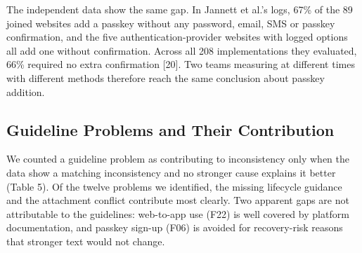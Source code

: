 \documentclass[letterpaper,twocolumn,10pt]{article}
\begin{document}
The independent data show the same gap. In Jannett et al.'s logs, 67\% of the 89 joined websites add a passkey without any password, email, SMS or passkey confirmation, and the five authentication-provider websites with logged options all add one without confirmation. Across all 208 implementations they evaluated, 66\% required no extra confirmation {[}20{]}. Two teams measuring at different times with different methods therefore reach the same conclusion about passkey addition.

\subsection{Guideline Problems and Their Contribution}

We counted a guideline problem as contributing to inconsistency only when the data show a matching inconsistency and no stronger cause explains it better (Table 5). Of the twelve problems we identified, the missing lifecycle guidance and the attachment conflict contribute most clearly. Two apparent gaps are not attributable to the guidelines: web-to-app use (F22) is well covered by platform documentation, and passkey sign-up (F06) is avoided for recovery-risk reasons that stronger text would not change.
\end{document}
